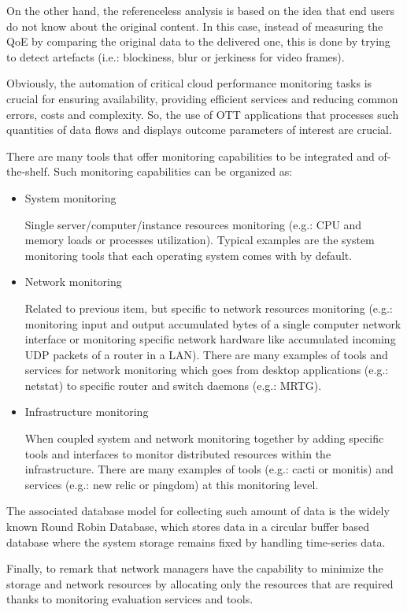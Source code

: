 On the other hand, the referenceless analysis is based on the idea that end users do not know about the original content. In this case, instead of measuring the QoE by comparing the original data to the delivered one, this is done by trying to detect artefacts (i.e.: blockiness, blur or jerkiness for video frames).

Obviously, the automation of critical cloud performance monitoring tasks is crucial for ensuring availability, providing efficient services and reducing common errors, costs and complexity. So, the use of OTT applications that processes such quantities of data flows and displays outcome parameters of interest are crucial. 

There are many tools that offer monitoring capabilities to be integrated and of-the-shelf. Such monitoring capabilities can be organized as:

\begin{itemize}
\item System monitoring \hfill

Single server/computer/instance resources monitoring (e.g.: CPU and memory loads or processes utilization). Typical examples are the system monitoring tools that each operating system comes with by default.
\item Network monitoring \hfill

Related to previous item, but specific to network resources monitoring (e.g.: monitoring input and output accumulated bytes of a single computer network interface or monitoring specific network hardware like accumulated incoming UDP packets of a router in a LAN). There are many examples of tools and services for network monitoring which goes from desktop applications (e.g.: netstat) to specific router and switch daemons (e.g.: MRTG).
\item Infrastructure monitoring \hfill

When coupled system and network monitoring together by adding specific tools and interfaces to monitor distributed resources within the infrastructure. There are many examples of tools  (e.g.: cacti or monitis) and services (e.g.: new relic or pingdom) at this monitoring level.
\end{itemize}

The associated database model for collecting such amount of data is the widely known Round Robin Database, which stores data in a circular buffer based database where the system storage remains fixed by handling time-series data. 

Finally, to remark that network managers have the capability to minimize the storage and network resources by allocating only the resources that are required thanks to monitoring evaluation services and tools.
 
